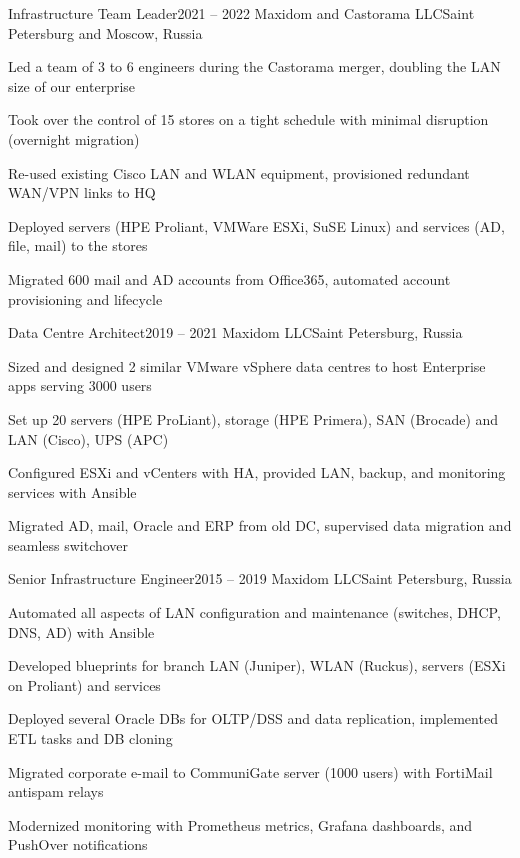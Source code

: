 
\vspace{5pt}
\expSubHeading
  {Infrastructure Team Leader}{2021 -- 2022}
  {Maxidom and Castorama LLC}{Saint Petersburg and Moscow, Russia}
\begin{zitemize}
\item Led a team of 3 to 6 engineers during the Castorama merger, doubling the LAN size of our enterprise
\item Took over the control of 15 stores on a tight schedule with minimal disruption (overnight migration)
\item Re-used existing Cisco LAN and WLAN equipment, provisioned redundant WAN/VPN links to HQ
\item Deployed servers (HPE Proliant, VMWare ESXi, SuSE Linux) and services (AD, file, mail) to the stores
\item Migrated 600 mail and AD accounts from Office365, automated account provisioning and lifecycle
\end{zitemize}

\expSubHeading
  {Data Centre Architect}{2019 -- 2021}
  {Maxidom LLC}{Saint Petersburg, Russia}
\begin{zitemize}
\item Sized and designed 2 similar VMware vSphere data centres to host Enterprise apps serving 3000 users
\item Set up 20 servers (HPE ProLiant), storage (HPE Primera), SAN (Brocade) and LAN (Cisco), UPS (APC)
\item Configured ESXi and vCenters with HA, provided LAN, backup, and monitoring services with Ansible
\item Migrated AD, mail, Oracle and ERP from old DC, supervised data migration and seamless switchover
\end{zitemize}

\expSubHeading
  {Senior Infrastructure Engineer}{2015 -- 2019}
  {Maxidom LLC}{Saint Petersburg, Russia}
\begin{zitemize}
\item Automated all aspects of LAN configuration and maintenance (switches, DHCP, DNS, AD) with Ansible
\item Developed blueprints for branch LAN (Juniper), WLAN (Ruckus), servers (ESXi on Proliant) and services
\item Deployed several Oracle DBs for OLTP/DSS and data replication, implemented ETL tasks and DB cloning
\item Migrated corporate e-mail to CommuniGate server (1000 users) with FortiMail antispam relays
\item Modernized monitoring with Prometheus metrics, Grafana dashboards, and PushOver notifications
\end{zitemize}


